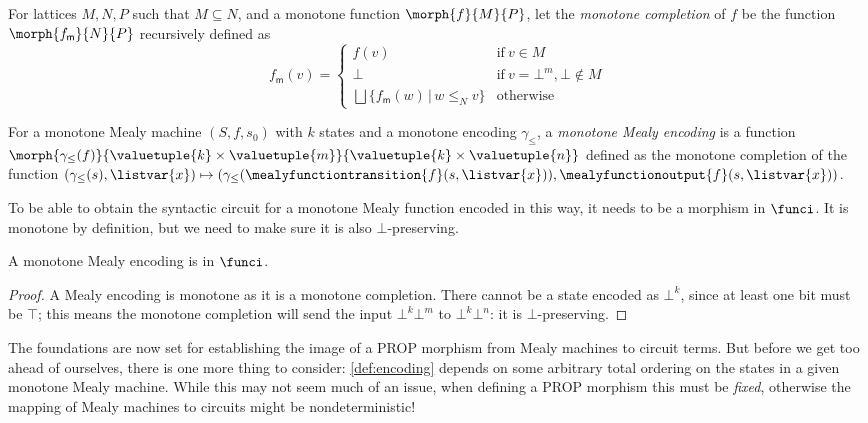 \begin{definition}\label{def:monotone-completion}
    For lattices \(M, N, P\) such that \(M \subseteq N\), and a monotone
    function \(\morph{f}{M}{P}\), let the \emph{monotone completion} of \(f\) be
    the function \(\morph{f_\mathsf{m}}{N}{P}\) recursively defined as \[
        f_\mathsf{m}(v) = \begin{cases}
            f(v)
             &
            \text{if}\ v \in M
            \\
            \bot
             &
            \text{if}\ v = \bot^m, \bot \not\in M
            \\
            \bigsqcup \{ f_\mathsf{m}(w) \,|\, w \leq_N v \}
             &
            \text{otherwise}
        \end{cases}
    \]
\end{definition}

\begin{definition}\label{def:mealy-encoding}
    For a monotone Mealy machine \((S, f, s_0)\) with \(k\) states and a
    monotone encoding \(\gamma_\leq\), a \emph{monotone Mealy encoding} is a
    function
    \(
    \morph{
        \gamma_\leq(f)
    }{
        \valuetuple{k} \times \valuetuple{m}
    }{
        \valuetuple{k} \times \valuetuple{n}
    }
    \) defined as the monotone completion of the function \(
    (\gamma_\leq(s), \listvar{x})
    \mapsto
    (
    \gamma_\leq(\mealyfunctiontransition{f}(s, \listvar{x})),
    \mealyfunctionoutput{f}(s, \listvar{x})
    )
    \).
\end{definition}

To be able to obtain the syntactic circuit for a monotone Mealy function encoded
in this way, it needs to be a morphism in \(\funci\).
It is monotone by definition, but we need to make sure it is also
\(\bot\)-preserving.

\begin{lemma}
    A monotone Mealy encoding is in \(\funci\).
\end{lemma}
\begin{proof}
    A Mealy encoding is monotone as it is a monotone completion.
    There cannot be a state encoded as \(\bot^k\), since at least one bit must
    be \(\top\); this means the monotone completion will send the input
    \(\bot^k\bot^m\) to \(\bot^k\bot^n\): it is
    \(\bot\)-preserving.
\end{proof}

The foundations are now set for establishing the image of a PROP morphism from
Mealy machines to circuit terms.
But before we get too ahead of ourselves, there is one more thing to consider:
\cref{def:encoding} depends on some arbitrary total ordering on the states in a
given monotone Mealy machine.
While this may not seem much of an issue, when
defining a PROP morphism this must be \emph{fixed}, otherwise the mapping of
Mealy machines to circuits might be nondeterministic!

